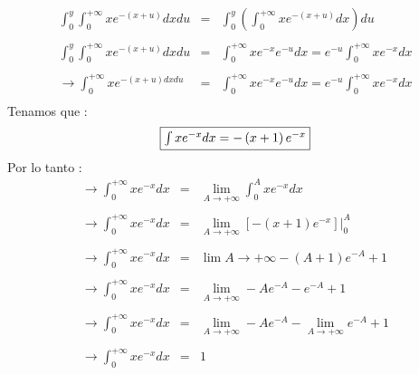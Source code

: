 \documentclass[12pt]{article}
\begin{document}
    \begin{equation*}
        \begin{array}{rcl}
            \int_{0}^{y}\int_{0}^{+\infty}xe^{-\left(x+u\right)}dx du & = & 
            \int_{0}^{y} \left(\int_{0}^{+\infty}xe^{-\left(x+u\right)}dx\right)du 
            \\
            \\
            \int_{0}^{y}\int_{0}^{+\infty}xe^{-\left(x+u\right)}dx du & = & \int_{0}^{+\infty}xe^{-x}e^{-u}dx = e^{-u}\int_{0}^{+\infty}xe^{-x}dx 
            \\
            \\
            \to\int_{0}^{+\infty}xe^{-\left(x+u\right)dx du} & = & \int_{0}^{+\infty}xe^{-x}e^{-u}dx = e^{-u}\int_{0}^{+\infty}xe^{-x}dx
            \\
        \end{array}
    \end{equation*}
    Tenamos que :
      \begin{equation*}
         \fbox{$\int xe^{-x}dx = -\left(x+1\right)e^{-x}$}
      \end{equation*}
    Por lo tanto :
    \begin{equation*}
        \begin{array}{rcl}
            \to\int_{0}^{+\infty}xe^{-x} dx & = & \displaystyle \lim_{A\to+\infty}\int_{0}^{A}xe^{-x}dx
            \\
            \\
            \to\int_{0}^{+\infty}xe^{-x} dx & = &  \displaystyle \lim_{A\to + \infty}[-\left(x+1\right)e^{-x}] \vert_{0}^{A} 
            \\
            \\
            \to\int_{0}^{+\infty}xe^{-x} dx & = &  \displaystyle\lim{A\to+\infty} -\left(A+1\right)e^{-A}+1
            \\
            \\
            \to\int_{0}^{+\infty}xe^{-x} dx & = &  \displaystyle \lim_{A\to+\infty}-Ae^{-A}-e^{-A}+1
            \\
            \\
            \to\int_{0}^{+\infty}xe^{-x} dx & = &  \displaystyle\lim_{A\to+\infty}-Ae^{-A}-\lim_{A\to+\infty}e^{-A}+1
            \\
            \\
            \to\int_{0}^{+\infty}xe^{-x} dx & = &  1
        \end{array}
    \end{equation*}
\end{document}

